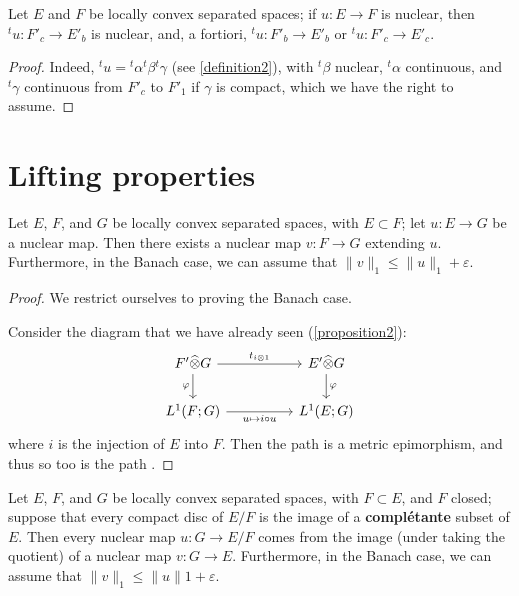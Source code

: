 \documentclass{article}
\theoremstyle{plain}
\newenvironment{proposition}[1]
    {\renewcommand\theinnercustomproposition{#1}\innercustomproposition}
    {\endinnercustomproposition}
\newenvironment{corollary}[1]
    {\renewcommand\theinnercustomcorollary{#1}\innercustomcorollary}
    {\endinnercustomcorollary}
\theoremstyle{definition}
\newcommand{\cotimes}{\widehat{\otimes}}
\newcommand{\transpose}[1]{{}^t\!{#1}}
\renewcommand{\leq}{\leqslant}
\newcommand{\oldpage}[1]{\marginpar{\footnotesize$\Big\vert$ \textit{p.~#1}}}
\begin{document}
\begin{corollary}{1}
\label{corollary-6}
  Let $E$ and $F$ be locally convex separated spaces;
  if $u\colon E\to F$ is nuclear, then $\transpose{u}\colon F'_c\to E'_b$ is nuclear, and, a fortiori, $\transpose{u}\colon F'_b\to E'_b$ or $\transpose{u}\colon F'_c\to E'_c$.
\end{corollary}

\begin{proof}
  Indeed, $\transpose{u}=\transpose{\alpha}\transpose{\beta}\transpose{\gamma}$ (see \cref{definition2}), with $\transpose{\beta}$ nuclear, $\transpose{\alpha}$ continuous, and $\transpose{\gamma}$ continuous from $F'_c$ to $F'_1$ if $\gamma$ is compact, which we have the right to assume.
\end{proof}


\section{Lifting properties}
\label{section6}

\oldpage{6}
\begin{proposition}{7}
\label{proposition7}
  Let $E$, $F$, and $G$ be locally convex separated spaces, with $E\subset F$;
  let $u\colon E\to G$ be a nuclear map.
  Then there exists a nuclear map $v\colon F\to G$ extending $u$.
  Furthermore, in the Banach case, we can assume that $\|v\|_1\leq\|u\|_1+\varepsilon$.
\end{proposition}

\begin{proof}
  We restrict ourselves to proving the Banach case.

  Consider the diagram that we have already seen (\cref{proposition2}):
  \[
    \begin{tikzcd}[column sep=huge]
      F'\cotimes G \ar[r,"t_{i\otimes1}"] \ar[d,swap,"\varphi"]
      & E'\cotimes G \ar[d,"\varphi"]
    \\L^1(F;G) \ar[r,swap,"u\mapsto i\circ u"]
      & L^1(E;G)
    \end{tikzcd}
  \]
  where $i$ is the injection of $E$ into $F$.
  Then the path  is a metric epimorphism, and thus so too is the path .
\end{proof}

\begin{proposition}{8}
\label{proposition8}
  Let $E$, $F$, and $G$ be locally convex separated spaces, with $F\subset E$, and $F$ closed;
  suppose that every compact disc of $E/F$ is the image of a \textbf{complétante} subset of $E$.
  Then every nuclear map $u\colon G\to E/F$ comes from the image (under taking the quotient) of a nuclear map $v\colon G\to E$.
  Furthermore, in the Banach case, we can assume that $\|v\|_1\leq\|u\|1+\varepsilon$.
\end{proposition}
\end{document}
